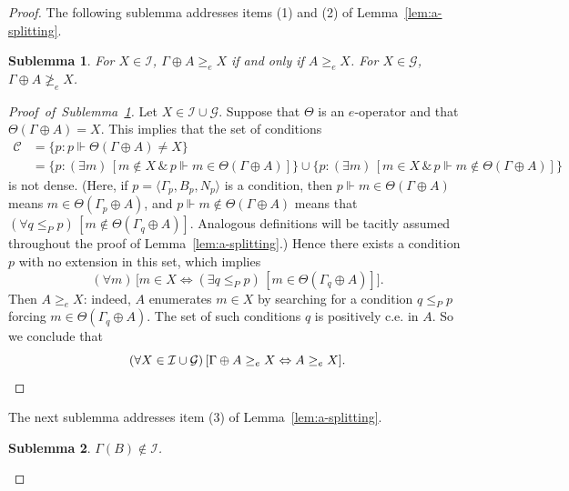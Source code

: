\documentclass[10pt,a4paper]{amsart}
\newtheorem{sublemma}{Sublemma}
\newcommand{\QA}[1]{(\forall{#1})\,}
\newcommand{\QE}[1]{(\exists{#1})\,}
\begin{document}
\begin{proof}
The following sublemma addresses items (1) and (2) of 
Lemma~\ref{lem:a-splitting}. 
 
\begin{sublemma}\label{lem:1}
For $X \in \mathcal{I}$,  $\Gamma \oplus A\geq_e X $ if and only if $A \geq_e 
X$. For $X \in \mathcal{G}$, $\Gamma \oplus A \ngeq_e X$. 
\end{sublemma}

\begin{proof}[Proof~of~Sublemma~\ref{lem:1}] 
Let $X \in \mathcal{I} \cup \mathcal{G}$. Suppose that $\Theta$ is an $e$-operator and 
that $\Theta(\Gamma\oplus A)=X$. This implies that the set of conditions 
\begin{align*}
\mathcal{C} &=\{p: p \Vdash \Theta(\Gamma\oplus A)\ne X\}\\
            &=\{p: \QE{m}\left [m \notin X \,\&\, p \Vdash m \in \Theta(\Gamma 
      \oplus A)\right]\} \cup \{p: \QE{m} \left[ m \in X \,\&\, p \Vdash m \notin 
      \Theta(\Gamma \oplus A) \right]\} 
\end{align*}
is not dense. (Here, if $p=\langle \Gamma_p, B_p, N_p \rangle$ is a 
condition, then $p \Vdash m \in \Theta(\Gamma \oplus A)$ means $m \in 
\Theta(\Gamma_p \oplus A)$, and $p \Vdash m \notin \Theta(\Gamma \oplus A)$ 
means that $\QA{q \le_{P} p}[m \notin \Theta(\Gamma_q \oplus A)]$. Analogous 
definitions will be tacitly assumed throughout the proof of 
Lemma~\ref{lem:a-splitting}.) Hence there exists a condition $p$ with no 
extension in this set, which implies 
\[
\QA{m} \big[ m \in X \Leftrightarrow \QE{q\leq_P p} 
[m \in \Theta(\Gamma_q \oplus A) ] \big].
\] 
Then $A\geq_e X$: indeed, $A$ enumerates $m \in X$ by searching for a 
condition $q \leq_P p$ forcing $m \in \Theta(\Gamma_q\oplus A)$. The set of 
such conditions $q$ is positively c.e. in $A$. So we conclude that 
\[
\QA{X \in \mathcal{I} \cup \mathcal{G}}[ \Gamma \oplus A \geq_e
X \Leftrightarrow A \geq_e X]. \qedhere
\] 
\end{proof}

The next sublemma addresses item (3) of Lemma~\ref{lem:a-splitting}. 

\begin{sublemma}\label{lem:2}
$\Gamma(B) \notin \mathcal{I}$. 
\end{sublemma}


\end{proof}
\end{document}

